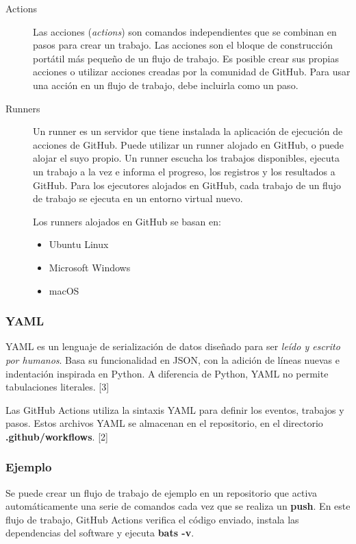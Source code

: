 \documentclass[twoside,twocolumn]{article}
\begin{document}
\begin{description}
    \item[Actions]
    Las acciones (\textit{actions}) son comandos independientes que se combinan en pasos para crear un trabajo. Las acciones son el bloque de construcción portátil más pequeño de un flujo de trabajo. Es posible crear sus propias acciones o utilizar acciones creadas por la comunidad de GitHub. Para usar una acción en un flujo de trabajo, debe incluirla como un paso.

    \item[Runners]
    Un runner es un servidor que tiene instalada la aplicación de ejecución de acciones de GitHub. Puede utilizar un runner alojado en GitHub, o puede alojar el suyo propio. Un runner escucha los trabajos disponibles, ejecuta un trabajo a la vez e informa el progreso, los registros y los resultados a GitHub. Para los ejecutores alojados en GitHub, cada trabajo de un flujo de trabajo se ejecuta en un entorno virtual nuevo.

    Los runners alojados en GitHub se basan en:

    \begin{itemize}
        \item Ubuntu Linux
        \item Microsoft Windows
        \item macOS
    \end{itemize}


\end{description}

\subsubsection{YAML}

YAML es un lenguaje de serialización de datos diseñado para ser \textit{leído y escrito por humanos}. Basa su funcionalidad en JSON, con la adición de líneas nuevas e indentación inspirada en Python. A diferencia de Python, YAML no permite tabulaciones literales. [3]

Las GitHub Actions utiliza la sintaxis YAML para definir los eventos, trabajos y pasos. Estos archivos YAML se almacenan en el repositorio, en el directorio \textbf{.github/workflows}. [2]

\subsubsection{Ejemplo}

Se puede crear un flujo de trabajo de ejemplo en un repositorio que activa automáticamente una serie de comandos cada vez que se realiza un \textbf{push}. En este flujo de trabajo, GitHub Actions verifica el código enviado, instala las dependencias del software y ejecuta \textbf{bats -v}.
\end{document}
